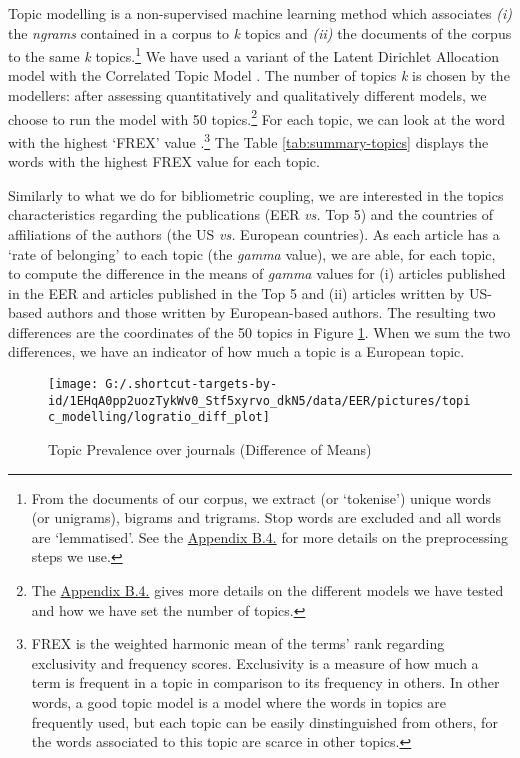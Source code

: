 \documentclass[]{elsarticle} %
\begin{document}
Topic modelling is a non-supervised machine learning method which
associates \emph{(i)} the \emph{ngrams} contained in a corpus to
\emph{k} topics and \emph{(ii)} the documents of the corpus to the same
\emph{k} topics.\footnote{From the documents of our corpus, we extract
  (or `tokenise') unique words (or unigrams), bigrams and trigrams. Stop
  words are excluded and all words are `lemmatised'. See the
  \protect\hyperlink{topic}{Appendix B.4.} for more details on the
  preprocessing steps we use.} We have used a variant of the Latent
Dirichlet Allocation model with the Correlated Topic Model
\citep{blei2007}. The number of topics \emph{k} is chosen by the
modellers: after assessing quantitatively and qualitatively different
models, we choose to run the model with 50 topics.\footnote{The
  \protect\hyperlink{topic}{Appendix B.4.} gives more details on the
  different models we have tested and how we have set the number of
  topics.} For each topic, we can look at the word with the highest
`FREX' value \citep{bischof2012}.\footnote{FREX is the weighted harmonic
  mean of the terms' rank regarding exclusivity and frequency scores.
  Exclusivity is a measure of how much a term is frequent in a topic in
  comparison to its frequency in others. In other words, a good topic
  model is a model where the words in topics are frequently used, but
  each topic can be easily dinstinguished from others, for the words
  associated to this topic are scarce in other topics.} The Table
\ref{tab:summary-topics} displays the words with the highest FREX value
for each topic.

Similarly to what we do for bibliometric coupling, we are interested in
the topics characteristics regarding the publications (EER \emph{vs.}
Top 5) and the countries of affiliations of the authors (the US
\emph{vs.} European countries). As each article has a `rate of
belonging' to each topic (the \emph{gamma} value), we are able, for each
topic, to compute the difference in the means of \emph{gamma} values for
(i) articles published in the EER and articles published in the Top 5
and (ii) articles written by US-based authors and those written by
European-based authors. The resulting two differences are the
coordinates of the 50 topics in Figure \ref{fig:plot-topic-diff}. When
we sum the two differences, we have an indicator of how much a topic is
a European topic.

\begin{figure}[h]

{\centering \texttt{[image: G:/.shortcut-targets-by-id/1EHqA0pp2uozTykWv0\_Stf5xyrvo\_dkN5/data/EER/pictures/topic\_modelling/logratio\_diff\_plot]} 

}

\caption{Topic Prevalence over journals (Difference of Means)}\label{fig:plot-topic-diff}
\end{figure}
\end{document}
